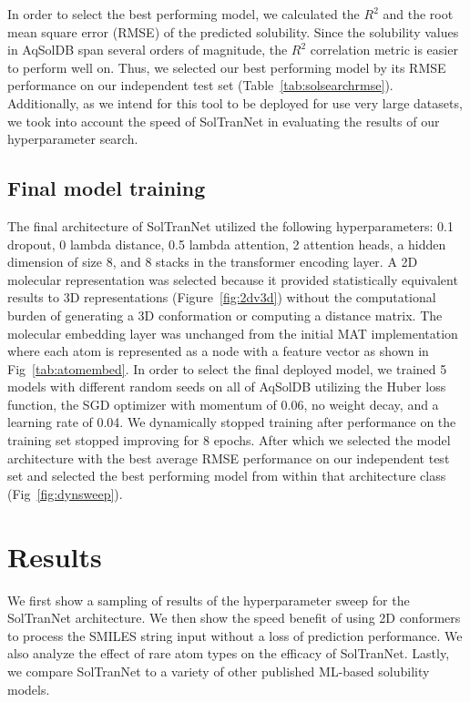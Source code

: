 \documentclass[journal=jmcmar,manuscript=article]{achemso}
\begin{document}
In order to select the best performing model, we calculated the $R^2$ and the root mean square error (RMSE) of the predicted solubility.
Since the solubility values in AqSolDB span several orders of magnitude, the $R^2$ correlation metric is easier to perform well on.
Thus, we selected our best performing model by its RMSE performance on our independent test set (Table~\ref{tab:solsearchrmse}).
Additionally, as we intend for this tool to be deployed for use very large datasets, we took into account the speed of SolTranNet in evaluating the results of our hyperparameter search. 

\subsection{Final model training}
The final architecture of SolTranNet utilized the following hyperparameters: 0.1 dropout, 0 lambda distance, 0.5 lambda attention, 2 attention heads, a hidden dimension of size 8, and 8 stacks in the transformer encoding layer. 
A 2D molecular representation was selected because it provided statistically equivalent results to 3D representations (Figure~\ref{fig:2dv3d}) without the computational burden of generating a 3D conformation or computing a distance matrix.
The molecular embedding layer was unchanged from the initial MAT implementation\cite{MAT} where each atom is represented as a node with a feature vector as shown in Fig~\ref{tab:atomembed}.
In order to select the final deployed model, we trained 5 models with different random seeds on all of AqSolDB utilizing the Huber loss function, the SGD optimizer with momentum of 0.06, no weight decay, and a learning rate of 0.04.
We dynamically stopped training after performance on the training set stopped improving for 8 epochs.
After which we selected the model architecture with the best average RMSE performance on our independent test set and selected the best performing model from within that architecture class (Fig~\ref{fig:dynsweep}).

\section{Results}

We first show a sampling of results of the hyperparameter sweep for the SolTranNet architecture.
We then show the speed benefit of using 2D conformers to process the SMILES string input without a loss of prediction performance.
We also analyze the effect of rare atom types on the efficacy of SolTranNet.
Lastly, we compare SolTranNet to a variety of other published ML-based solubility models.
\end{document}
